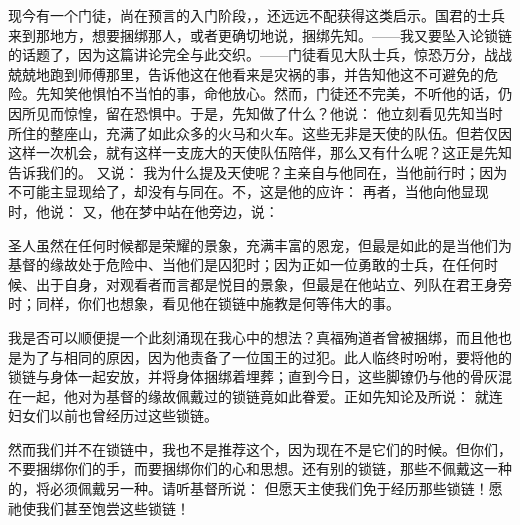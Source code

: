 现今有一个门徒，尚在预言的入门阶段，，还远远不配获得这类启示。国君的士兵来到那地方，想要捆绑那人，或者更确切地说，捆绑先知。——我又要坠入论锁链的话题了，因为这篇讲论完全与此交织。——门徒看见大队士兵，惊恐万分，战战兢兢地跑到师傅那里，告诉他这在他看来是灾祸的事，并告知他这不可避免的危险。先知笑他惧怕不当怕的事，命他放心。然而，门徒还不完美，不听他的话，仍因所见而惊惶，留在恐惧中。于是，先知做了什么？他说： 他立刻看见先知当时所住的整座山，充满了如此众多的火马和火车。这些无非是天使的队伍。但若仅因这样一次机会，就有这样一支庞大的天使队伍陪伴，那么又有什么呢？这正是先知告诉我们的。 又说： 我为什么提及天使呢？主亲自与他同在，当他前行时；因为不可能主显现给了，却没有与同在。不，这是他的应许： 再者，当他向他显现时，他说： 又，他在梦中站在他旁边，说：\par

圣人虽然在任何时候都是荣耀的景象，充满丰富的恩宠，但最是如此的是当他们为基督的缘故处于危险中、当他们是囚犯时；因为正如一位勇敢的士兵，在任何时候、出于自身，对观看者而言都是悦目的景象，但最是在他站立、列队在君王身旁时；同样，你们也想象，看见他在锁链中施教是何等伟大的事。\par

我是否可以顺便提一个此刻涌现在我心中的想法？真福殉道者曾被捆绑，而且他也是为了与相同的原因，因为他责备了一位国王的过犯。此人临终时吩咐，要将他的锁链与身体一起安放，并将身体捆绑着埋葬；直到今日，这些脚镣仍与他的骨灰混在一起，他对为基督的缘故佩戴过的锁链竟如此眷爱。正如先知论及所说： 就连妇女们以前也曾经历过这些锁链。\par

然而我们并不在锁链中，我也不是推荐这个，因为现在不是它们的时候。但你们，不要捆绑你们的手，而要捆绑你们的心和思想。还有别的锁链，那些不佩戴这一种的，将必须佩戴另一种。请听基督所说： 但愿天主使我们免于经历那些锁链！愿祂使我们甚至饱尝这些锁链！\par

